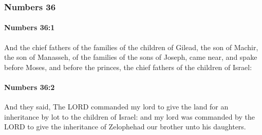 	\subsubsection{Numbers 36} %
		\label{NUMBERS-36}

		\paragraph{Numbers 36:1} %
			\label{NUMBERS-36-1}

			And the chief fathers of the families of the children of Gilead, the son of Machir, the son of Manasseh, of the families of the sons of Joseph, came near, and spake before Moses, and before the princes, the chief fathers of the children of Israel:


		\paragraph{Numbers 36:2} %
			\label{NUMBERS-36-2}

			And they said, The LORD commanded my lord to give the land for an inheritance by lot to the children of Israel: and my lord was commanded by the LORD to give the inheritance of Zelophehad our brother unto his daughters.

